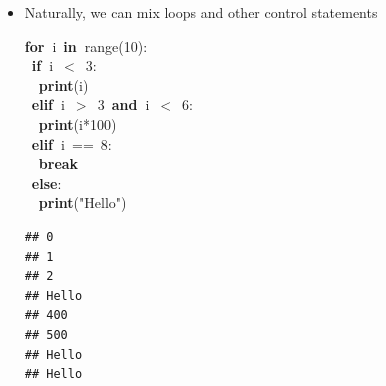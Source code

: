 \documentclass{beamer}\usepackage[]{graphicx}\usepackage[]{color}
\makeatletter
\newcommand{\hlnum}[1]{\textcolor[rgb]{0.686,0.059,0.569}{#1}}%
\newcommand{\hlstr}[1]{\textcolor[rgb]{0.192,0.494,0.8}{#1}}%
\newcommand{\hlopt}[1]{\textcolor[rgb]{0,0,0}{#1}}%
\newcommand{\hlstd}[1]{\textcolor[rgb]{0.345,0.345,0.345}{#1}}%
\newcommand{\hlkwa}[1]{\textcolor[rgb]{0.161,0.373,0.58}{\textbf{#1}}}%
\newcommand{\hlkwb}[1]{\textcolor[rgb]{0.69,0.353,0.396}{#1}}%
\newenvironment{kframe}{%
 \def\at@end@of@kframe{}%
 \ifinner\ifhmode%
  \def\at@end@of@kframe{\end{minipage}}%
  \begin{minipage}{\columnwidth}%
 \fi\fi%
 \def\FrameCommand##1{\hskip\@totalleftmargin \hskip-\fboxsep
 \colorbox{shadecolor}{##1}\hskip-\fboxsep
     \hskip-\linewidth \hskip-\@totalleftmargin \hskip\columnwidth}%
 \MakeFramed {\advance\hsize-\width
   \@totalleftmargin\z@ \linewidth\hsize
   \@setminipage}}%
 {\par\unskip\endMakeFramed%
 \at@end@of@kframe}
\newenvironment{knitrout}{}{} %
\makeatother
\begin{document}
\begin{frame}[fragile]
\begin{itemize}
	\item Naturally, we can mix loops and other control statements 

\begin{knitrout}\tiny
{}\color{fgcolor}\begin{kframe}
\noindent
\ttfamily
\hlstd{}\hlkwa{for\ }\hlstd{i\ }\hlkwa{in\ }\hlstd{}\hlkwb{range}\hlstd{}\hlopt{(}\hlstd{}\hlnum{10}\hlstd{}\hlopt{):}\hspace*{\fill}\\
\hlstd{\ }\hlkwa{if\ }\hlstd{i\ }\hlopt{$<$\ }\hlstd{}\hlnum{3}\hlstd{}\hlopt{:}\hspace*{\fill}\\
\hlstd{}\hlstd{\ \ }\hlstd{}\hlkwa{print}\hlstd{}\hlopt{(}\hlstd{i}\hlopt{)}\hspace*{\fill}\\
\hlstd{\ }\hlkwa{elif\ }\hlstd{i\ }\hlopt{$>$\ }\hlstd{}\hlnum{3\ }\hlstd{}\hlkwa{and\ }\hlstd{i\ }\hlopt{$<$\ }\hlstd{}\hlnum{6}\hlstd{}\hlopt{:}\hspace*{\fill}\\
\hlstd{}\hlstd{\ \ }\hlstd{}\hlkwa{print}\hlstd{}\hlopt{(}\hlstd{i}\hlopt{{*}}\hlstd{}\hlnum{100}\hlstd{}\hlopt{)}\hspace*{\fill}\\
\hlstd{\ }\hlkwa{elif\ }\hlstd{i\ }\hlopt{==\ }\hlstd{}\hlnum{8}\hlstd{}\hlopt{:}\hspace*{\fill}\\
\hlstd{}\hlstd{\ \ }\hlstd{}\hlkwa{break}\hspace*{\fill}\\
\hlstd{\ }\hlkwa{else}\hlstd{}\hlopt{:}\hspace*{\fill}\\
\hlstd{}\hlstd{\ \ }\hlstd{}\hlkwa{print}\hlstd{}\hlopt{(}\hlstd{}\hlstr{"Hello"}\hlstd{}\hlopt{)}\hlstd{}\hspace*{\fill}
\mbox{}
\normalfont

\begin{verbatim}
## 0
## 1
## 2
## Hello
## 400
## 500
## Hello
## Hello
\end{verbatim}
\end{kframe}
\end{knitrout}
\end{itemize}
\end{frame}
\end{document}
